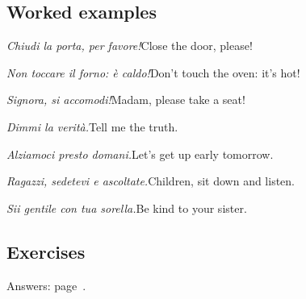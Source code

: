 \documentclass[11pt,a4paper,twoside,openright]{book}
\begin{document}
\subsection*{Worked examples}
\begin{examples}
\item\relax \textit{Chiudi la porta, per favore!}\newline Close the door, please!
\item\relax \textit{Non toccare il forno: è caldo!}\newline Don't touch the oven: it's hot!
\item\relax \textit{Signora, si accomodi!}\newline Madam, please take a seat!
\item\relax \textit{Dimmi la verità.}\newline Tell me the truth.
\item\relax \textit{Alziamoci presto domani.}\newline Let's get up early tomorrow.
\item\relax \textit{Ragazzi, sedetevi e ascoltate.}\newline Children, sit down and listen.
\item\relax \textit{Sii gentile con tua sorella.}\newline Be kind to your sister.
\end{examples}

\subsection*{Exercises}\label{les:imperativo:exercises}
{\color{muted}\small Answers: page~\pageref{ans:imperativo}.}
\end{document}

